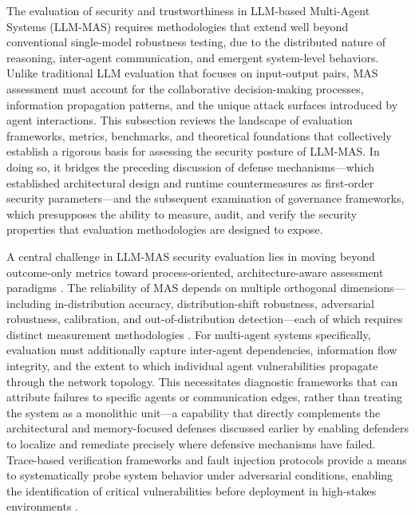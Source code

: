 \documentclass[11pt]{article}
\begin{document}
The evaluation of security and trustworthiness in LLM-based Multi-Agent Systems (LLM-MAS) requires methodologies that extend well beyond conventional single-model robustness testing, due to the distributed nature of reasoning, inter-agent communication, and emergent system-level behaviors. Unlike traditional LLM evaluation that focuses on input-output pairs, MAS assessment must account for the collaborative decision-making processes, information propagation patterns, and the unique attack surfaces introduced by agent interactions. This subsection reviews the landscape of evaluation frameworks, metrics, benchmarks, and theoretical foundations that collectively establish a rigorous basis for assessing the security posture of LLM-MAS. In doing so, it bridges the preceding discussion of defense mechanisms---which established architectural design and runtime countermeasures as first-order security parameters---and the subsequent examination of governance frameworks, which presupposes the ability to measure, audit, and verify the security properties that evaluation methodologies are designed to expose.

A central challenge in LLM-MAS security evaluation lies in moving beyond outcome-only metrics toward process-oriented, architecture-aware assessment paradigms \cite{ref445}. The reliability of MAS depends on multiple orthogonal dimensions---including in-distribution accuracy, distribution-shift robustness, adversarial robustness, calibration, and out-of-distribution detection---each of which requires distinct measurement methodologies \cite{ref445}. For multi-agent systems specifically, evaluation must additionally capture inter-agent dependencies, information flow integrity, and the extent to which individual agent vulnerabilities propagate through the network topology. This necessitates diagnostic frameworks that can attribute failures to specific agents or communication edges, rather than treating the system as a monolithic unit---a capability that directly complements the architectural and memory-focused defenses discussed earlier by enabling defenders to localize and remediate precisely where defensive mechanisms have failed. Trace-based verification frameworks and fault injection protocols provide a means to systematically probe system behavior under adversarial conditions, enabling the identification of critical vulnerabilities before deployment in high-stakes environments \cite{ref446}.
\end{document}
